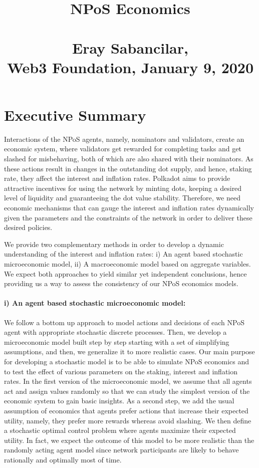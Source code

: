 \documentclass[a4,11pt]{paper}
\title{\vspace{-60pt} \centering NPoS Economics \\ \qquad  \vspace{-20pt} \\ \large{Eray Sabancilar, 
\\ Web3 Foundation, January 9, 2020} \vspace{-40pt}}
\begin{document}
\maketitle

\section*{Executive Summary}
Interactions of the NPoS agents, namely, nominators and validators, create an economic system, where validators get rewarded for completing tasks and get slashed for misbehaving, both of which are also shared with their nominators. As these actions result in changes in the outstanding dot supply, and hence, staking rate, they affect the interest and inflation rates. Polkadot aims to provide attractive incentives for using the network by minting dots, keeping a desired level of liquidity and guaranteeing the dot value stability. Therefore, we need economic mechanisms that can gauge the interest and inflation rates dynamically given the parameters and the constraints of the network in order to deliver these desired policies.

We provide two complementary methods in order to develop a dynamic understanding of the interest and inflation rates: i) An agent based stochastic microeconomic model, ii) A macroeconomic model based on aggregate variables. We expect both approaches to yield similar yet independent conclusions, hence providing us a way to assess the consistency of our NPoS economics models.

\paragraph{i) An agent based stochastic microeconomic model:}
We follow a bottom up approach to model actions and decisions of each NPoS agent with appropriate stochastic discrete processes. Then, we develop a microeconomic model built step by step starting with a set of simplifying assumptions, and then, we generalize it to more realistic cases. Our main purpose for developing a stochastic model is to be able to simulate NPoS economics and to test the effect of various parameters on the staking, interest and inflation rates. In the first version of the microeconomic model, we assume that all agents act and assign values randomly so that we can study the simplest version of the economic system to gain basic insights. As a second step, we add the usual assumption of economics that agents prefer actions that increase their expected utility, namely, they prefer more rewards whereas avoid slashing. We then define a stochastic optimal control problem where agents maximize their expected utility. In fact, we expect the outcome of this model to be more realistic than the randomly acting agent model since network participants are likely to behave rationally and optimally most of time. 
\end{document}
